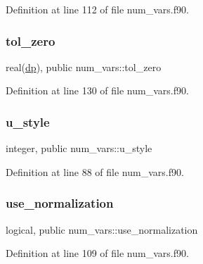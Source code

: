 Definition at line 112 of file num\+\_\+vars.\+f90.

\mbox{\label{namespacenum__vars_ae2387f8182114da91104322ca3250d9a}} 
\subsubsection{\texorpdfstring{tol\+\_\+zero}{tol\_zero}}
{\footnotesize\ttfamily real(\hyperlink{namespacenum__vars_a03802aa2bd86439d7a9370836fabf3f2}{dp}), public num\+\_\+vars\+::tol\+\_\+zero}



Definition at line 130 of file num\+\_\+vars.\+f90.

\mbox{\label{namespacenum__vars_a5b3a837df1e82bb43fc47815c62c6b49}} 
\subsubsection{\texorpdfstring{u\+\_\+style}{u\_style}}
{\footnotesize\ttfamily integer, public num\+\_\+vars\+::u\+\_\+style}



Definition at line 88 of file num\+\_\+vars.\+f90.

\mbox{\label{namespacenum__vars_a585ed16ea01f299cd764690f057af2c6}} 
\subsubsection{\texorpdfstring{use\+\_\+normalization}{use\_normalization}}
{\footnotesize\ttfamily logical, public num\+\_\+vars\+::use\+\_\+normalization}



Definition at line 109 of file num\+\_\+vars.\+f90.

\mbox{\label{namespacenum__vars_adedd3c1e77cfdf75dac84e43ee54497a}} 
